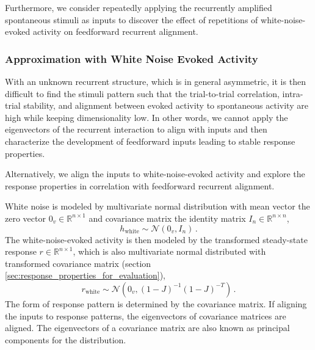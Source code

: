 \documentclass[11pt]{article}
\begin{document}
{	Furthermore, we consider repeatedly applying the recurrently amplified spontaneous stimuli as inputs to discover the effect of repetitions of white-noise-evoked activity on feedforward recurrent alignment. 
	
	\subsubsection{Approximation with White Noise Evoked Activity} \label{sec:white_noise_approx_ffrec}%
	With an unknown recurrent structure, which is in general asymmetric, it is then difficult to find the stimuli pattern such that the trial-to-trial correlation, intra-trial stability, and alignment between evoked activity to spontaneous activity are high while keeping dimensionality low. In other words, we cannot apply the eigenvectors of the recurrent interaction to align with inputs and then characterize the development of feedforward inputs leading to stable response properties. 
	
	Alternatively, we align the inputs to white-noise-evoked activity and explore the response properties in correlation with feedforward recurrent alignment. 
		
	White noise is modeled by multivariate normal distribution with mean vector the zero vector $0_v \in \mathbb{R}^{n \times 1}$ and covariance matrix the identity matrix $I_n \in \mathbb{R}^{n \times n}$, 
		\begin{equation}
			h_{\text{white}} \sim \mathcal{N}(0_v, I_n) \, .
		\end{equation}
	The white-noise-evoked activity is then modeled by the transformed steady-state response $r \in \mathbb{R}^{n \times 1}$, which is also multivariate normal distributed with transformed covariance matrix (section \ref{sec:response_properties_for_evaluation}), 
		\begin{equation}
			r_{\text{white}} \sim \mathcal{N}\left(0_v, (1-J)^{-1}(1-J)^{-T}\right) \, .
		\end{equation}
	The form of response pattern is determined by the covariance matrix. If aligning the inputs to response patterns, the eigenvectors of covariance matrices are aligned. The eigenvectors of a covariance matrix are also known as principal components for the distribution. 
	
}
\end{document}

